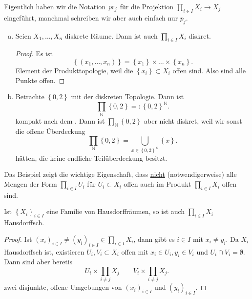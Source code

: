 \begin{remark}
    Eigentlich haben wir die Notation $\operatorname{pr}_j$ für die Projektion  $\prod _{i \in I}X_i \to  X_j$ eingeführt, manchmal schreiben wir aber auch einfach nur $p_j$.
\end{remark}
\begin{example}
    \begin{enumerate}[a)]
        \item Seien $X_1,\ldots,X_n$ diskrete Räume. Dann ist auch $\prod_{i \in I}X_i$ diskret.
            \begin{proof}
                Es ist
                \[
                    \left \{(x_1,\ldots,x_n)\right\}  = \left \{x_1\right\} \times \ldots\times \left \{x_n\right\} 
                .\] 
                Element der Produkttopologie, weil die $\left \{x_i\right\} \subset X_i$ offen sind. Also sind alle Punkte offen.
            \end{proof}
        \item Betrachte $\left \{0,2\right\} $ mit der diskreten Topologie. Dann ist
            \[
            \prod_{\mathbb{N}} \left \{0,2\right\} =: \left \{0,2\right\} ^{\mathbb{N}}
            .\] 
            kompakt nach dem . Dann ist $\prod_{\mathbb{N}} \left \{0,2\right\} $ aber nicht diskret, weil wir sonst die offene Überdeckung
            \[
            \prod_{\mathbb{N}} \left \{0,2\right\} = \bigcup_{x\in \left \{0,2\right\} ^{\mathbb{N}}}  \left \{x\right\} 
            .\] 
            hätten, die keine endliche Teilüberdeckung besitzt.
    \end{enumerate}
\end{example}
\begin{remark*}
    Das Beispiel zeigt die wichtige Eigenschaft, dass \underline{nicht} (notwendigerweise) alle Mengen der Form $\prod_{i \in I}U_i$ für $U_i\subset X_i$ offen auch im Produkt $\prod_{i \in I}X_i$ offen sind.
\end{remark*}

\begin{theorem}\label{thm:produkte-von-Hausdorff-Räumen-sind-Hausdorff}
    Ist $\left \{X_i\right\} _{i \in I}$ eine Familie von Hausdorffräumen, so ist auch  $\prod _{i \in I} X_i$ Hausdorffsch.
\end{theorem}
\begin{proof}
    Ist $(x_i)_{i \in I} \neq  (y_i)_{i \in I} \in  \prod _{i \in I}X_i$, dann gibt es $i\in I$ mit $x_i \neq  y_i$. Da $X_i$ Hausdorffsch ist, existieren  $U_i, V_i \subset X_i$ offen mit $x_i \in U_i, y_i \in V_i$ und $U_i \cap  V_i = \emptyset$. Dann sind aber beretis
    \[
    U_i \times  \prod_{i\neq j} X_j \qquad V_i \times \prod_{i\neq j} X_j
    .\] 
    zwei disjunkte, offene Umgebungen von $(x_i)_{i \in I}$ und $(y_i)_{i \in I}$.
\end{proof}

